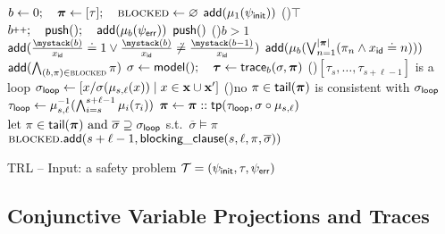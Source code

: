 \begin{algorithm}[t]
  $b \gets 0; \quad \bm{\mathrm{\pi}} \gets [\tau]; \quad \textsc{blocked} \gets \varnothing$\; \label{alg:init}
  $\mathsf{add}(\mu_{1}(\psi_{\mathsf{init}}))$ 
  \While(){$\top$}{
    $b\increment; \quad \push(); \quad \add(\mu_{b}(\psi_\err))$  \label{alg:err1}
    $\mathsf{push}()$ 
    \lIf(){$b>1$}{$\add(\ind[\id]{x}{b} \doteq 1 \lor
      \ind[\id]{x}{b} \not\doteq \ind[\id]{x}{b-1})$} \label{alg:trans}
    $\mathsf{add}(\mu_{b}(\bigvee_{n=1}^{|\bm{\mathrm{\pi}}|} (\pi_n \land x_{\mathsf{id}} \doteq n)))$  \label{alg:unroll}
    $\mathsf{add}(\bigwedge_{(b,\pi) \in \textsc{blocked}} \pi)$  \label{alg:block1}
    $\sigma \gets \mathsf{model}(); \quad \bm{\mathrm{\tau}} \gets \mathsf{trace}_b(\sigma,\bm{\mathrm{\pi}})$ \label{alg:trace} 
    \If(){$[\tau_s,\ldots,\tau_{s+\ell-1}]$ is a loop \label{alg:loop}}{
      $\sigma_{\mathsf{loop}} \gets [x / \sigma(\mu_{s,\ell}(x)) \mid x \in \bm{\mathrm{x}} \cup \bm{\mathrm{x}}']$ \label{alg:model}
      \If(){no $\pi \in \mathsf{tail}(\bm{\mathrm{\pi}})$ is consistent with $\sigma_{\mathsf{loop}}$ \label{alg:redundant}}{
        $\tau_{\mathsf{loop}} \gets \mu_{s,\ell}^{-1}(\bigwedge_{i=s}^{s+\ell-1} \mu_{i}(\tau_i))$ \label{alg:learn1} 
        $\bm{\mathrm{\pi}} \gets \bm{\mathrm{\pi}}\mathrel{::}\mathsf{tp}(\tau_{\mathsf{loop}}, \sigma \circ \mu_{s,\ell})$ \label{alg:learn2} 
      }
      $\text{let } \pi \in \mathsf{tail}(\bm{\mathrm{\pi}}) \text{ and } \overline{\sigma} \supseteq
      \sigma_{\mathsf{loop}}$ s.t.\ $\overline{\sigma} \models
\pi$  \label{alg:pick}
      $\textsc{blocked}.\mathsf{add}(s+\ell-1,\mathsf{blocking\_clause}(s,\ell,\pi,\overline{\sigma}))$  \label{alg:block2}
    }
  }
  \caption{TRL -- Input: a safety problem $\mathcal{T} = (\psi_{\mathsf{init}},\tau,\psi_{\mathsf{err}})$}
  \label{alg}
\end{algorithm}

\subsection{Conjunctive Variable Projections and Traces}
\label{sec:basics}


